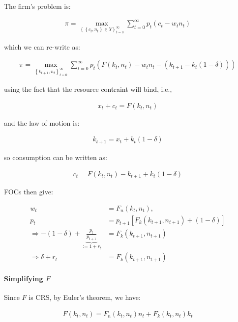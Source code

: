 \documentclass[10pt]{article}
\begin{document}
The firm's problem is:

\begin{align}
    \pi=\max _{\left\{\left\{c_t, n_t\right\} \in Y\right\}_{t=0}^{\infty}} \sum_{t=0}^{\infty} p_t\left(c_t-w_t n_t\right)
\end{align}

which we can re-write as:

\begin{align}
    \pi=\max _{\left\{k_{t+1}, n_t\right\}_{t=0}^{\infty}} \sum_{t=0}^{\infty} p_t\left(F\left(k_t, n_t\right)-w_t n_t-\left(k_{t+1}-k_t(1-\delta)\right)\right)
\end{align}

using the fact that the resource contraint will bind, i.e., 

\begin{align}
    x_t+c_t=F\left(k_t, n_t\right)
\end{align}

and the law of motion is:

\begin{align}
    k_{t+1}=x_t+k_t(1-\delta)
\end{align}

so consumption can be written as:

\begin{align}
    c_t=F\left(k_t, n_t\right)-k_{t+1}+k_t(1-\delta)
\end{align}

FOCs then give:

\begin{align}
    w_t & =F_n\left(k_t, n_t\right), \\
    p_t & =p_{t+1}\left[F_k\left(k_{t+1}, n_{t+1}\right)+(1-\delta)\right] \\
    \Rightarrow-(1-\delta)+\underbrace{\frac{p_t}{p_{t+1}}}_{:=1+r_t} & =F_k\left(k_{t+1}, n_{t+1}\right) \\
    \Rightarrow \delta+r_t & =F_k\left(k_{t+1}, n_{t+1}\right)
\end{align}

\paragraph{Simplifying $F$}

Since $F$ is CRS, by Euler's theorem, we have:

\begin{align}
    F\left(k_t, n_t\right)=F_n\left(k_t, n_t\right) n_t+F_k\left(k_t, n_t\right) k_t
\end{align}
\end{document}
